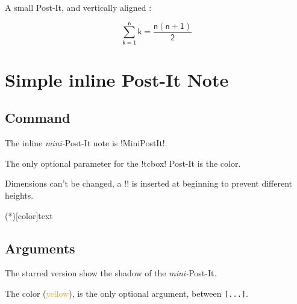 \documentclass[english,a4paper,11pt]{article}
\newcommand\Cle[1]{{\small\sffamily\textlangle \textcolor{orange}{#1}\textrangle}}
\begin{document}
\begin{DemoCode}[]
\begin{wrapstuff}[r,top=1]
\begin{PostItNote}[Rotate=5,Render=tikzv2,Pin=Scotch,Color=pink]
\lipsum[1][1-2]
\end{PostItNote}
\end{wrapstuff}

\lipsum[1]
\end{DemoCode}

\begin{DemoCode}[]
A small Post-It, and vertically aligned :
%
\hfill\begin{PostItNote}[Rotate=-10,Color=orange,Width=5cm,Height=5cm, AlignV=center,Corner,PinColor=yellow, PinShift=-1,AlignPostIt=center]

\textsf{\small\lipsum[1][1-2]}
\[\mathsf{\displaystyle\sum_{k=1}^{n} k = \dfrac{n(n+1)}{2}}\]
\end{PostItNote}
\end{DemoCode}

\pagebreak

\section{Simple inline Post-It Note}

\subsection{Command}

\begin{cautionblock}
The inline \textit{mini-}Post-It note is \motcletex!MiniPostIt!.

The only optional parameter for the \motcletex!tcbox! Post-It is the color.

\smallskip

Dimensions can't be changed, a \motcletex!\vphantom! is inserted at beginning to prevent different heights.
\end{cautionblock}

\begin{DemoCode}
\MiniPostIt(*)[color]{text}
\end{DemoCode}

\subsection{Arguments}

\begin{noteblock}
The starred version show the shadow of the \textit{mini-}Post-It.

The color (\Cle{yellow}), is the only optional argument, between \texttt{[...]}.
\end{noteblock}
\end{document}
